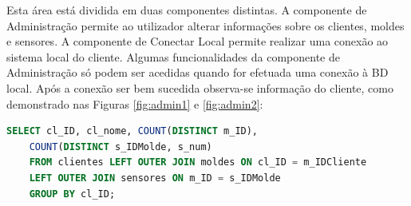 \documentclass[11pt,twoside,a4paper]{report}
\begin{document}
Esta área está dividida em duas componentes distintas. A componente de Administração permite ao utilizador alterar informações sobre os clientes, moldes e sensores. A componente de Conectar Local permite realizar uma conexão ao sistema local do cliente. Algumas funcionalidades da componente de Administração só podem ser acedidas quando for efetuada uma conexão à BD local. Após a conexão ser bem sucedida observa-se informação do cliente, como demonstrado nas Figuras \ref{fig:admin1} e \ref{fig:admin2}:
\begin{lstlisting}[language = SQL]
	SELECT cl_ID, cl_nome, COUNT(DISTINCT m_ID),
	COUNT(DISTINCT s_IDMolde, s_num)
	FROM clientes LEFT OUTER JOIN moldes ON cl_ID = m_IDCliente
	LEFT OUTER JOIN sensores ON m_ID = s_IDMolde
	GROUP BY cl_ID;
\end{lstlisting}
\end{document}
